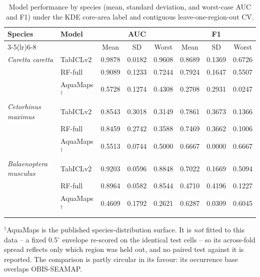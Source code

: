 \begin{table}[t]
\centering
\caption{Model performance by species (mean, standard deviation, and worst-case AUC and F1) under the KDE core-area label and contiguous leave-one-region-out CV.}
\label{tab:by-species}
\begin{tabular}{llcccccc}
\toprule
\multirow{2}{*}{Species} & \multirow{2}{*}{Model} & \multicolumn{3}{c}{AUC} & \multicolumn{3}{c}{F1} \\
\cmidrule(lr){3-5}\cmidrule(lr){6-8}
 & & Mean & SD & Worst & Mean & SD & Worst \\
\midrule
\emph{Caretta caretta} & TabICLv2 & 0.9878 & 0.0182 & 0.9608 & 0.8689 & 0.1369 & 0.6726 \\
 & RF-full & 0.9089 & 0.1233 & 0.7244 & 0.7924 & 0.1647 & 0.5507 \\
 & AquaMaps$^{\dagger}$ & 0.5728 & 0.1274 & 0.4308 & 0.2708 & 0.2931 & 0.0247 \\
\addlinespace
\emph{Cetorhinus maximus} & TabICLv2 & 0.8543 & 0.3018 & 0.3149 & 0.7861 & 0.3673 & 0.1366 \\
 & RF-full & 0.8459 & 0.2742 & 0.3588 & 0.7469 & 0.3662 & 0.1006 \\
 & AquaMaps$^{\dagger}$ & 0.5513 & 0.0744 & 0.5000 & 0.6667 & 0.0000 & 0.6667 \\
\addlinespace
\emph{Balaenoptera musculus} & TabICLv2 & 0.9203 & 0.0596 & 0.8848 & 0.7022 & 0.1669 & 0.5094 \\
 & RF-full & 0.8964 & 0.0582 & 0.8544 & 0.4710 & 0.4196 & 0.1227 \\
 & AquaMaps$^{\dagger}$ & 0.4609 & 0.1792 & 0.2621 & 0.6287 & 0.0309 & 0.6045 \\
\addlinespace
\bottomrule
\end{tabular}
\begin{minipage}{\linewidth}\footnotesize $^{\dagger}$AquaMaps is the published species-distribution surface. It is \emph{not} fitted to this data -- a fixed 0.5$^{\circ}$ envelope re-scored on the identical test cells -- so its across-fold spread reflects only which region was held out, and no paired test against it is reported. The comparison is partly circular in its favour: its occurrence base overlaps OBIS-SEAMAP.\end{minipage}
\end{table}

